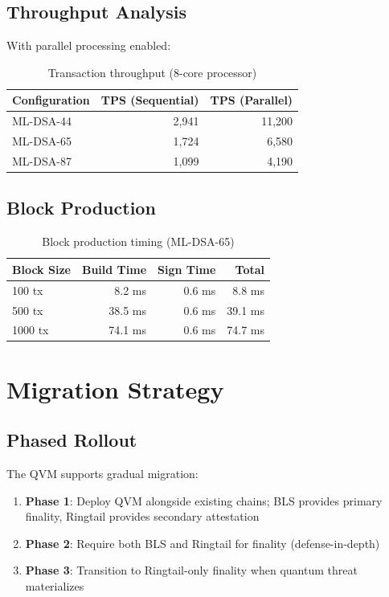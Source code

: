 \documentclass[11pt,a4paper]{article}
\begin{document}
\subsection{Throughput Analysis}

With parallel processing enabled:

\begin{table}[h]
\centering
\begin{tabular}{lrr}
\toprule
\textbf{Configuration} & \textbf{TPS (Sequential)} & \textbf{TPS (Parallel)} \\
\midrule
ML-DSA-44 & 2,941 & 11,200 \\
ML-DSA-65 & 1,724 & 6,580 \\
ML-DSA-87 & 1,099 & 4,190 \\
\bottomrule
\end{tabular}
\caption{Transaction throughput (8-core processor)}
\end{table}

\subsection{Block Production}

\begin{table}[h]
\centering
\begin{tabular}{lrrr}
\toprule
\textbf{Block Size} & \textbf{Build Time} & \textbf{Sign Time} & \textbf{Total} \\
\midrule
100 tx & 8.2 ms & 0.6 ms & 8.8 ms \\
500 tx & 38.5 ms & 0.6 ms & 39.1 ms \\
1000 tx & 74.1 ms & 0.6 ms & 74.7 ms \\
\bottomrule
\end{tabular}
\caption{Block production timing (ML-DSA-65)}
\end{table}

\section{Migration Strategy}

\subsection{Phased Rollout}

The QVM supports gradual migration:

\begin{enumerate}
    \item \textbf{Phase 1}: Deploy QVM alongside existing chains; BLS provides primary finality, Ringtail provides secondary attestation
    \item \textbf{Phase 2}: Require both BLS and Ringtail for finality (defense-in-depth)
    \item \textbf{Phase 3}: Transition to Ringtail-only finality when quantum threat materializes
\end{enumerate}
\end{document}
